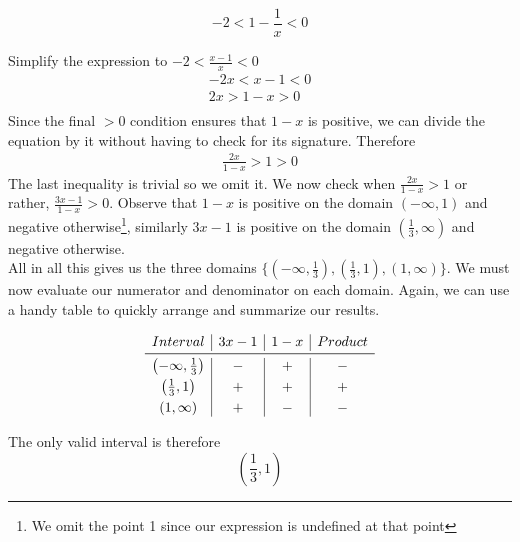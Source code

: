 \documentclass[a4paper]{article}
\begin{document}
\begin{question}{}{}
\[
-2 < 1 - \frac{1}{x} < 0
\]
\end{question}
Simplify the expression to \(-2 < \frac{x-1}{x} < 0\)
\begin{align*}
-2x < x -1 < 0 \\
2x > 1-x > 0 \\
\end{align*}
Since the final \(> 0\) condition ensures that \(1-x\) is positive, we can divide the equation by it without having to check for its signature. Therefore
\begin{align*}
\frac{2x}{1-x} > 1 > 0
\end{align*}
The last inequality is trivial so we omit it. We now check when \(\frac{2x}{1-x} > 1\) or rather, \(\frac{3x-1}{1-x} > 0\). Observe that \(1-x\) is positive on the domain \((-\infty, 1)\) and negative otherwise\footnote{We omit the point 1 since our expression is undefined at that point}, similarly \(3x-1\) is positive on the domain \((\frac{1}{3}, \infty)\) and negative otherwise. \\ 

All in all this gives us the three domains \(\{(-\infty, \frac{1}{3}), (\frac{1}{3}, 1), (1, \infty)\}\). We must now evaluate our numerator and denominator on each domain. Again, we can use a handy table to quickly arrange and summarize our results.

\[
\begin{array}{c|c|c|c}
Interval & 3x-1 & 1 - x & Product \\
\midrule
\left(-\infty, \frac{1}{3}\right) & - & + & - \\[3pt]
\left(\frac{1}{3}, 1\right) & + & + & + \\[3pt]
(1, \infty) & + & - & -
\end{array}
\]

The only valid interval is therefore 
\[
\left(\frac{1}{3}, 1\right)
\]

\begin{center}
\end{center}
\end{document}
